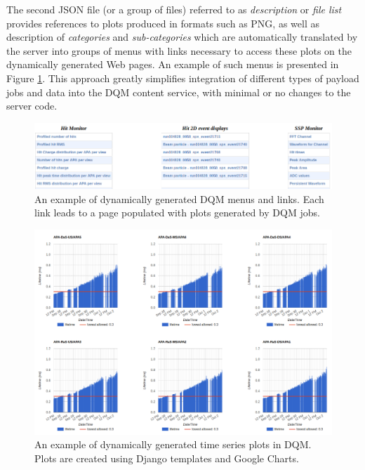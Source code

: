 \documentclass{webofc}
\begin{document}
The second JSON file (or a group of files) referred to as \textit{description} or \textit{file list}
provides references to plots produced in formats such as PNG, as well as description of
\textit{categories} and \textit{sub-categories} which are automatically translated by the server into
groups of menus with links necessary to access these plots on the dynamically generated
Web pages. An example of such menus is presented in Figure \ref{fig:tpc_monitor}.
This approach greatly simplifies integration of different types of payload jobs 
and data into the DQM content service, with minimal or no changes to the
server code.

\begin{figure}[tb]
\centering\includegraphics[width=1.0\textwidth]{figures/tpc_monitor_2018_v2.png}
\caption{\label{fig:tpc_monitor}An example of dynamically generated DQM menus and links. Each link leads to
a page populated with plots generated by DQM jobs.}
\end{figure}


\begin{figure}[tb]
\centering\includegraphics[width=1.0\textwidth]{figures/purity_chart_2018_v2.png}
\caption{\label{fig:purity_chart}An example of dynamically generated time series plots in DQM. Plots are created
using Django templates and Google Charts.}
\end{figure}
\end{document}

